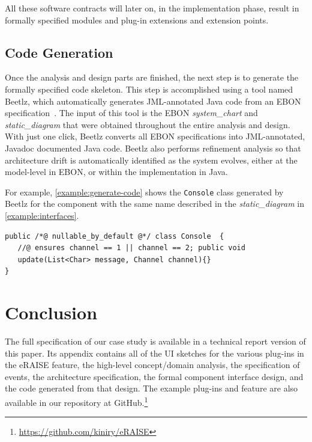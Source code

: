 \documentclass[conference]{IEEEtran}
\begin{document}
All these software contracts will later on, in the implementation
phase, result in formally specified modules and plug-in extensions and
extension points.

%
\subsection{Code Generation}
\label{sec:code-generation}

Once the analysis and design parts are finished, the next step is to
generate the formally specified code skeleton.  This step is
accomplished using a tool named Beetlz, which automatically generates
JML-annotated Java code from an EBON specification~\cite{Darulova09}.
The input of this tool is the EBON \emph{system\_chart} and
\emph{static\_diagram} that were obtained throughout the entire
analysis and design.  With just one click, Beetlz converts all EBON
specifications into JML-annotated, Javadoc documented Java code.
Beetlz also performs refinement analysis so that architecture drift is
automatically identified as the system evolves, either at the
model-level in EBON, or within the implementation in Java.

For example, \autoref{example:generate-code} shows the
\texttt{Console} class generated by Beetlz for the component with the
same name described in the \emph{static\_diagram} in
\autoref{example:interfaces}.

\begin{lstlisting}[label={example:generate-code},
caption={Java Console class generated by Beetlz}]
public /*@ nullable_by_default @*/ class Console  {
   //@ ensures channel == 1 || channel == 2; public void
   update(List<Char> message, Channel channel){}
}
\end{lstlisting}

\section{Conclusion}
\label{sec:conclusion}

The full specification of our case study is available in a technical
report version of this paper.  Its appendix contains all of the UI
sketches for the various plug-ins in the eRAISE feature, the high-level
concept/domain analysis, the specification of events, the architecture
specification, the formal component interface design, and the code
generated from that design.  The example plug-ins and feature are also
available in our repository at
GitHub.\footnote{\url{https://github.com/kiniry/eRAISE}}
\end{document}
